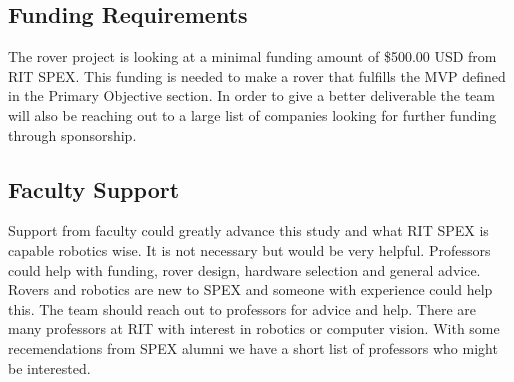\documentclass[conference]{IEEEtran} %
\begin{document}
\subsection{Funding Requirements}

The rover project is looking at a minimal funding amount of \$500.00 USD from RIT SPEX. This funding is needed to make a rover that fulfills the MVP defined in the Primary Objective section. In order to give a better deliverable the team will also be reaching out to a large list of companies looking for further funding through sponsorship. 

\subsection{Faculty Support}
Support from faculty could greatly advance this study and what RIT SPEX is capable robotics wise. It is not necessary but would be very helpful. Professors could help with funding, rover design, hardware selection and general advice. Rovers and robotics are new to SPEX and someone with experience could help this. The team should reach out to professors for advice and help. There are many professors at RIT with interest in robotics or computer vision. With some recemendations from SPEX alumni we have a short list of professors who might be interested. 

\end{document}
